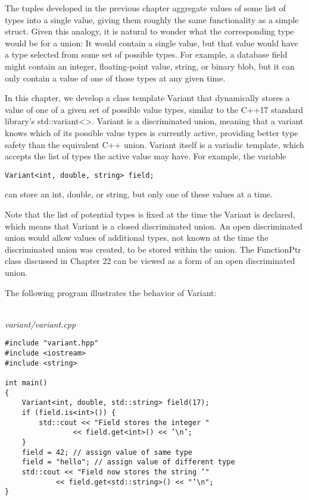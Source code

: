 The tuples developed in the previous chapter aggregate values of some list of types into a single value, giving them roughly the same functionality as a simple struct. Given this analogy, it is natural 
to wonder what the corresponding type would be for a union: It would contain a single value, but that value would have a type selected from some set of possible types. For example, a database field might contain an integer, floating-point value, string, or binary blob, but it can only contain a value of one of those types at any given time.

In this chapter, we develop a class template Variant that dynamically stores a value of one of a given set of possible value types, similar to the C++17 standard library’s std::variant<>. Variant is a discriminated union, meaning that a variant knows which of its possible value types is currently active, providing better type safety than the equivalent C++ union. Variant itself is a variadic template, which accepts the list of types the active value may have. For example, the variable

\begin{lstlisting}[style=styleCXX]
Variant<int, double, string> field;
\end{lstlisting}

can store an int, double, or string, but only one of these values at a time.

\begin{tcolorbox}[colback=webgreen!5!white,colframe=webgreen!75!black]
\hspace*{0.75cm}Note that the list of potential types is fixed at the time the Variant is declared, which means that Variant is a closed discriminated union. An open discriminated union would allow values of additional types, not known at the time the discriminated union was created, to be stored within the union. The FunctionPtr class discussed in Chapter 22 can be viewed as a form of an open discriminated union.
\end{tcolorbox}

The following program illustrates the behavior of Variant:

\hspace*{\fill} \\ %
\noindent
\textit{variant/variant.cpp}
\begin{lstlisting}[style=styleCXX]
#include "variant.hpp"
#include <iostream>
#include <string>
 
int main()
{
	Variant<int, double, std::string> field(17);
	if (field.is<int>()) {
		std::cout << "Field stores the integer "
				<< field.get<int>() << ’\n’;
	}
	field = 42; // assign value of same type
	field = "hello"; // assign value of different type
	std::cout << "Field now stores the string ’"
			<< field.get<std::string>() << "’\n";
}
\end{lstlisting}

